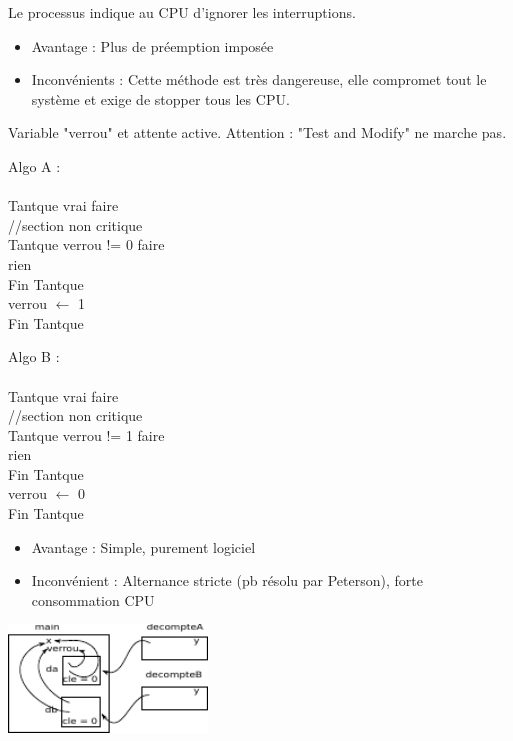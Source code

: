  Le processus indique au CPU d'ignorer les interruptions. 
	\begin{itemize}
		\item Avantage : Plus de préemption imposée
		\item Inconvénients : Cette méthode est très dangereuse, elle compromet tout le système et exige de stopper tous les CPU.
	\end{itemize}

 Variable "verrou" et attente active. Attention : "Test and Modify" ne marche pas. \\
\begin{minipage}{0.5\linewidth}
Algo A : \\
\\
Tantque vrai faire\\
  //section non critique\\
	Tantque verrou != 0 faire \\
		rien \\
	Fin Tantque\\
	verrou $\leftarrow$ 1\\
Fin Tantque\\
\end{minipage}
\begin{minipage}{0.5\linewidth}
Algo B : \\
\\
Tantque vrai faire\\
  //section non critique\\
	Tantque verrou != 1 faire \\
		rien \\
	Fin Tantque\\
	verrou $\leftarrow$ 0\\
Fin Tantque\\
\end{minipage}

\begin{itemize}
	\item Avantage : Simple, purement logiciel
	\item Inconvénient : Alternance stricte (pb résolu par Peterson), forte consommation CPU
\end{itemize}

\includegraphics[width=200px]{fig7.pdf}
